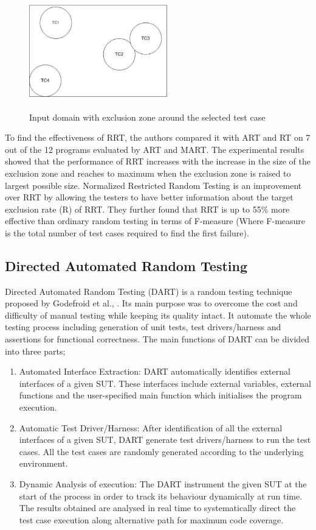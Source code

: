 \begin{figure}[h]
	\centering
	\includegraphics[width= 6cm, height = 5cm]{Literature/RRT.pdf}
	\caption{Input domain with exclusion zone around the selected test case}
\end{figure}

To find the effectiveness of RRT, the authors compared it with ART and RT on 7 out of the 12 programs evaluated by ART and MART. The experimental results showed that the performance of RRT increases with the increase in the size of the exclusion zone and reaches to maximum when the exclusion zone is raised to largest possible size. Normalized Restricted Random Testing \cite{chan2003normalized} is an improvement over RRT by allowing the testers to have better information about the target exclusion rate (R) of RRT. They further found that RRT is up to 55\% more effective than ordinary random testing in terms of F-measure (Where F-measure is the total number of test cases required to find the first failure).



\subsection{Directed Automated Random Testing}
Directed Automated Random Testing (DART) is a random testing technique proposed by Godefroid et al., \cite{Godefroid2005}. Its main purpose was to overcome the cost and difficulty of manual testing while keeping its quality intact. It automate the whole testing process including generation of unit tests, test drivers/harness and assertions for functional correctness. The main functions of DART can be divided into three parts;
\begin{enumerate}
\item Automated Interface Extraction: DART automatically identifies external interfaces of a given SUT. These interfaces include external variables, external functions and the user-specified main function which initialises the program execution.
\item Automatic Test Driver/Harness: After identification of all the external interfaces of a given SUT, DART generate test drivers/harness to run the test cases. All the test cases are randomly generated according to the underlying environment.
\item Dynamic Analysis of execution: The DART instrument the given SUT at the start of the process in order to track its behaviour dynamically at run time. The results obtained are analysed in real time to systematically direct the test case execution along alternative path for maximum code coverage.
\end{enumerate}


